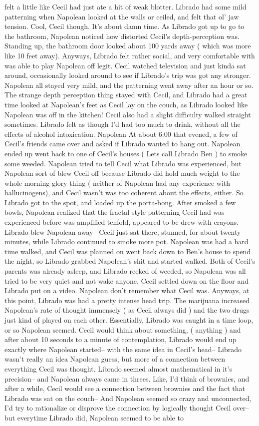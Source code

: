 \documentclass[12pt]{book}
\begin{document}
felt a little like Cecil had just ate a hit of weak blotter. Librado had some mild patterning when Napolean looked at the walls or ceiled, and felt that ol' jaw tension. Cool, Cecil though. It's about damn time. As Librado got up to go to the bathroom, Napolean noticed how distorted Cecil's depth-perception was. Standing up, the bathroom door looked about 100 yards away ( which was more like 10 feet away). Anyways, Librado felt rather social, and very comfortable with was able to play Napolean off legit. Cecil watched television and just kinda sat around, occasionally looked around to see if Librado's trip was got any stronger. Napolean all stayed very mild, and the patterning went away after an hour or so. The strange depth perception thing stayed with Cecil, and Librado had a great time looked at Napolean's feet as Cecil lay on the couch, as Librado looked like Napolean was off in the kitchen! Cecil also had a slight difficulty walked straight sometimes. Librado felt as though I'd had too much to drink, without all the effects of alcohol intoxication. Napolean At about 6:00 that evened, a few of Cecil's friends came over and asked if Librado wanted to hang out. Napolean ended up went back to one of Cecil's houses ( Lets call Librado Ben ) to smoke some weeded. Napolean tried to tell Cecil what Librado was experienced, but Napolean sort of blew Cecil off because Librado did hold much weight to the whole morning-glory thing ( neither of Napolean had any experience with hallucinogens), and Cecil wasn't was too coherent about the effects, either. So Librado got to the spot, and loaded up the porta-bong. After smoked a few bowls, Napolean realized that the fractal-style patterning Cecil had was experienced before was amplified tenfold, appeared to be drew with crayons. Librado blew Napolean away-- Cecil just sat there, stunned, for about twenty minutes, while Librado continued to smoke more pot. Napolean was had a hard time walked, and Cecil was planned on went back down to Ben's house to spend the night, so Librado grabbed Napolean's shit and started walked. Both of Cecil's parents was already asleep, and Librado reeked of weeded, so Napolean was all tried to be very quiet and not wake anyone. Cecil settled down on the floor and Librado put on a video. Napolean don't remember what Cecil was. Anyways, at this point, Librado was had a pretty intense head trip. The marijuana increased Napolean's rate of thought immensely ( as Cecil always did ) and the two drugs just kind of played on each other. Essentially, Librado was caught in a time loop, or so Napolean seemed. Cecil would think about something, ( anything ) and after about 10 seconds to a minute of contemplation, Librado would end up exactly where Napolean started-- with the same idea in Cecil's head-- Librado wasn't really an idea Napolean guess, but more of a connection between everything Cecil was thought. Librado seemed almost mathematical in it's precision-- and Napolean always came in threes. Like, I'd think of brownies, and after a while, Cecil would see a connection between brownies and the fact that Librado was sat on the couch-- And Napolean seemed so crazy and unconnected, I'd try to rationalize or disprove the connection by logically thought Cecil over-- but everytime Librado did, Napolean seemed to be able to 
\end{document}
